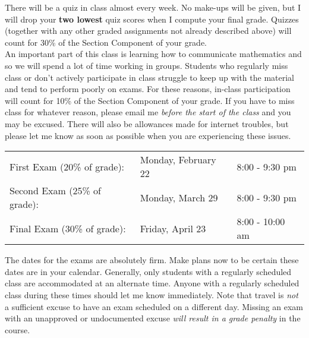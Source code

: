 \documentclass[11pt,twoside]{article}
\newcommand\topic[1]{\noindent{\bf #1}}
\begin{document}
\vspace{-2pt}
\topic{Quizzes:}  There will be a quiz in class almost every week.  No make-ups will be given, but I will drop your {\bf two lowest} quiz scores when I compute your final grade.  Quizzes (together with any other graded assignments not already described above) will count for 30\% of the Section Component of your grade.\\ %

\vspace{-2pt}
\topic{Participation:} An important part of this class is learning how to communicate mathematics and so we will spend a lot of time working in groups. Students who regularly miss class or don't actively participate in class struggle to keep up with the material and tend to perform poorly on exams. For these reasons, in-class participation will count for 10\% of the Section Component of your grade. If you have to miss class for whatever reason, please email me \emph{before the start of the class} and you may be excused. There will also be allowances made for internet troubles, but please let me know as soon as possible when you are experiencing these issues. \\ %

 \topic{Uniform Exams:} 
 \vspace{2pt}
 
\hspace{-5ex}
\begin{tabular}{lll}
{First Exam (20\%  of grade):} & Monday, February 22 & 8:00 - 9:30 pm \\
{Second Exam (25\% of grade):} &  Monday, March 29 & 8:00 - 9:30 pm  \\
{Final Exam (30\% of grade):} & Friday, April 23 & 8:00 - 10:00 am 
\end{tabular}

\vspace{0.1in} 


\noindent The dates for the exams are absolutely firm.  Make plans {\sc now} to be certain these dates are in your calendar.  Generally, only students with a regularly scheduled
class are accommodated at an alternate time. Anyone with a
regularly scheduled class during these times should let me know immediately. Note that travel is \emph{not} a sufficient excuse to have an exam scheduled on a different day.
Missing an exam with an unapproved or undocumented excuse {\em will result in a grade penalty} in the course. %
\end{document}
